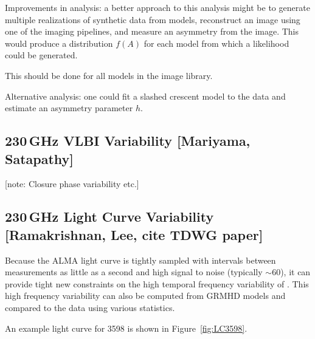 \documentclass[twocolumn,tighten,dvipsnames,linenumbers]{aastex63}
\newcommand\note[1]{{\color{OliveGreen}[note: #1]}}
\begin{document}
Improvements in analysis: a better approach to this analysis might be to generate multiple realizations of synthetic data from models, reconstruct an image using one of the imaging pipelines, and measure an asymmetry from the image.  This would produce a distribution $f(A)$ for each model from which a likelihood could be generated.

This should be done for all models in the \sgra image library.

Alternative analysis: one could fit a slashed crescent model to the data and estimate an asymmetry parameter $h$.

\subsection{230\,GHz VLBI Variability
  [Mariyama, Satapathy]}
\label{sec:230variability}

\note{Closure phase variability etc.}


\subsection{230\,GHz Light Curve Variability
  [Ramakrishnan, Lee, cite TDWG paper]}
\label{sec:230lightcurve}

Because the ALMA light curve is tightly sampled with intervals  between measurements as little as a second and high signal to noise (typically $\sim 60$), it can provide tight new constraints on the high temporal frequency variability of \sgra.  This high frequency variability can also be computed from GRMHD models and compared to the data using various statistics.

An example light curve for 3598 is shown in Figure~\ref{fig:LC3598}.
\end{document}
